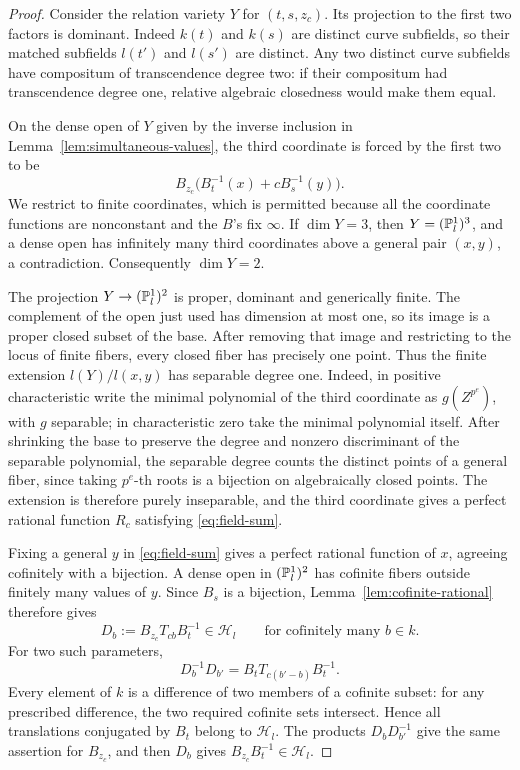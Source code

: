 \begin{proof}
Consider the relation variety \(Y\) for \((t,s,z_c)\).  Its projection to
the first two factors is dominant.  Indeed \(k(t)\) and \(k(s)\) are
distinct curve subfields, so their matched subfields \(l(t')\) and
\(l(s')\) are distinct.  Any two distinct curve subfields have compositum
of transcendence degree two: if their compositum had transcendence degree
one, relative algebraic closedness would make them equal.

On the dense open of \(Y\) given by the inverse inclusion in
Lemma~\ref{lem:simultaneous-values}, the third coordinate is forced by the
first two to be
\[
 B_{z_c}\bigl(B_t^{-1}(x)+cB_s^{-1}(y)\bigr).
\]
We restrict to finite coordinates, which is permitted because all the
coordinate functions are nonconstant and the \(B\)'s fix \(\infty\).
If \(\dim Y=3\), then \(Y=(\mathbb P^1_l)^3\), and a dense open has infinitely
many third coordinates above a general pair \((x,y)\), a contradiction.
Consequently \(\dim Y=2\).

The projection \(Y\to(\mathbb P^1_l)^2\) is proper, dominant and generically
finite.  The complement of the open just used has dimension at most one,
so its image is a proper closed subset of the base.  After removing that
image and restricting to the locus of finite fibers, every closed fiber
has precisely one point.  Thus the finite extension \(l(Y)/l(x,y)\)
has separable degree one.  Indeed, in positive characteristic write the
minimal polynomial of the third coordinate as \(g(Z^{p^e})\), with \(g\)
separable; in characteristic zero take the minimal polynomial itself.
After shrinking the base to preserve the degree and nonzero discriminant
of the separable polynomial,
the separable degree counts the distinct points of a general fiber,
since taking \(p^e\)-th roots is a bijection on algebraically closed
points.  The extension is therefore purely
inseparable, and the third coordinate gives a perfect rational function
\(R_c\) satisfying \eqref{eq:field-sum}.

Fixing a general \(y\) in \eqref{eq:field-sum} gives a perfect rational
function of \(x\), agreeing cofinitely with a bijection.  A dense open in
\((\mathbb P^1_l)^2\) has cofinite fibers outside finitely many values of \(y\).
Since \(B_s\) is a bijection, Lemma~\ref{lem:cofinite-rational} therefore gives
\[
 D_b:=B_{z_c}T_{cb}B_t^{-1}\in\mathcal H_l
 \qquad\text{for cofinitely many }b\in k.
\]
For two such parameters,
\[
 D_b^{-1}D_{b'}=B_tT_{c(b'-b)}B_t^{-1}.
\]
Every element of \(k\) is a difference of two members of a cofinite subset:
for any prescribed difference, the two required cofinite sets intersect.
Hence all translations conjugated by \(B_t\) belong to \(\mathcal H_l\).
The products \(D_bD_{b'}^{-1}\) give the same assertion for \(B_{z_c}\),
and then \(D_b\) gives \(B_{z_c}B_t^{-1}\in\mathcal H_l\).


\end{proof}
